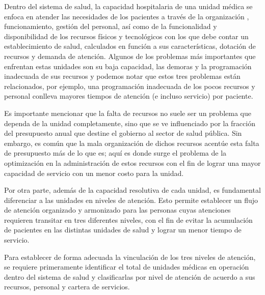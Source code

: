 \documentclass[10pt]{article}
\begin{document}
    Dentro del sistema de salud, la capacidad hospitalaria de una unidad médica se enfoca en atender las necesidades de los pacientes a través de la organización \cite{MEDESK}, funcionamiento, gestión del personal, así como de la funcionalidad y disponibilidad de los recursos físicos y tecnológicos con los que debe contar un establecimiento de salud, calculados en función a sus características, dotación de recursos y demanda de atención. Algunos de los problemas más importantes que enfrentan estas unidades son su baja capacidad, las demoras y la programación inadecuada de sus recursos \cite{MEDESK} y podemos notar que estos tres problemas están relacionados, por ejemplo, una programación inadecuada de los pocos recursos y personal conlleva mayores tiempos de atención (e incluso servicio) por paciente.
    
    Es importante mencionar que la falta de recursos no suele ser un problema que dependa de la unidad completamente, sino que se ve influenciado por la fracción del presupuesto anual que destine el gobierno al sector de salud pública. Sin embargo, es común que la mala organización de dichos recursos acentúe esta falta de presupuesto más de lo que es; aquí es donde surge el problema de la optimización en la administración de estos recursos con el fin de lograr una mayor capacidad de servicio con un menor costo para la unidad.
    
    Por otra parte, además de la capacidad resolutiva de cada unidad, es fundamental diferenciar a las unidades en niveles de atención. Esto permite establecer un flujo de atención organizado y armonizado para las personas cuyas atenciones requieren transitar en tres diferentes niveles, con el fin de evitar la acumulación de pacientes en las distintas unidades de salud y lograr un menor tiempo de servicio.
    
    Para establecer de forma adecuada la vinculación de los tres niveles de atención, se requiere primeramente identificar el total de unidades médicas en operación dentro del sistema de salud y clasificarlas por nivel de atención de acuerdo a sus recursos, personal y cartera de servicios.
    
\end{document}
